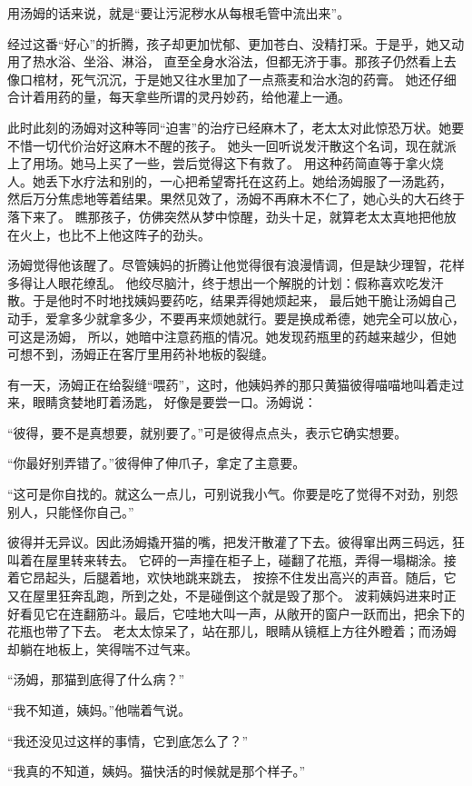\documentclass[12pt,UTF8]{ctexbook}
\begin{document}
用汤姆的话来说，就是“要让污泥秽水从每根毛管中流出来”。

经过这番“好心”的折腾，孩子却更加忧郁、更加苍白、没精打采。于是乎，她又动用了热水浴、坐浴、淋浴，
直至全身水浴法，但都无济于事。那孩子仍然看上去像口棺材，死气沉沉，于是她又往水里加了一点燕麦和治水泡的药膏。
她还仔细合计着用药的量，每天拿些所谓的灵丹妙药，给他灌上一通。

此时此刻的汤姆对这种等同“迫害”的治疗已经麻木了，老太太对此惊恐万状。她要不惜一切代价治好这麻木不醒的孩子。
她头一回听说发汗散这个名词，现在就派上了用场。她马上买了一些，尝后觉得这下有救了。
用这种药简直等于拿火烧人。她丢下水疗法和别的，一心把希望寄托在这药上。她给汤姆服了一汤匙药，
然后万分焦虑地等着结果。果然见效了，汤姆不再麻木不仁了，她心头的大石终于落下来了。
瞧那孩子，仿佛突然从梦中惊醒，劲头十足，就算老太太真地把他放在火上，也比不上他这阵子的劲头。

汤姆觉得他该醒了。尽管姨妈的折腾让他觉得很有浪漫情调，但是缺少理智，花样多得让人眼花缭乱。
他绞尽脑汁，终于想出一个解脱的计划：假称喜欢吃发汗散。于是他时不时地找姨妈要药吃，结果弄得她烦起来，
最后她干脆让汤姆自己动手，爱拿多少就拿多少，不要再来烦她就行。要是换成希德，她完全可以放心，可这是汤姆，
所以，她暗中注意药瓶的情况。她发现药瓶里的药越来越少，但她可想不到，汤姆正在客厅里用药补地板的裂缝。

有一天，汤姆正在给裂缝“喂药”，这时，他姨妈养的那只黄猫彼得喵喵地叫着走过来，眼睛贪婪地盯着汤匙，
好像是要尝一口。汤姆说：

“彼得，要不是真想要，就别要了。”可是彼得点点头，表示它确实想要。

“你最好别弄错了。”彼得伸了伸爪子，拿定了主意要。

“这可是你自找的。就这么一点儿，可别说我小气。你要是吃了觉得不对劲，别怨别人，只能怪你自己。”

彼得并无异议。因此汤姆撬开猫的嘴，把发汗散灌了下去。彼得窜出两三码远，狂叫着在屋里转来转去。
它砰的一声撞在柜子上，碰翻了花瓶，弄得一塌糊涂。接着它昂起头，后腿着地，欢快地跳来跳去，
按捺不住发出高兴的声音。随后，它又在屋里狂奔乱跑，所到之处，不是碰倒这个就是毁了那个。
波莉姨妈进来时正好看见它在连翻筋斗。最后，它哇地大叫一声，从敞开的窗户一跃而出，把余下的花瓶也带了下去。
老太太惊呆了，站在那儿，眼睛从镜框上方往外瞪着；而汤姆却躺在地板上，笑得喘不过气来。

“汤姆，那猫到底得了什么病？”

“我不知道，姨妈。”他喘着气说。

“我还没见过这样的事情，它到底怎么了？”

“我真的不知道，姨妈。猫快活的时候就是那个样子。”
\end{document}
